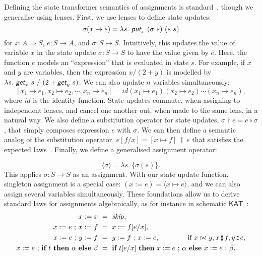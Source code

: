 \documentclass[envcountsame,envcountsect]{llncs}
\newcommand{\sskip}{\mathit{skip}}
\newcommand{\KAT}{\mathsf{KAT}}
\newcommand{\lput}{\textit{\textsf{put}}}
\newcommand{\lget}{\textit{\textsf{get}}}
\newcommand{\lto}{\Longrightarrow}
\newcommand{\lindep}{\mathop{\,\bowtie\,}}
\newcommand{\unrest}{\mathop{\sharp}}
\newcommand{\seq}{\mathop{\,;\,}}
\newcommand{\subapp}{\mathop{\,\dagger\,}}
\begin{document}
Defining the state transformer semantics of assignments is
standard~\cite{MuniveS19}, though we generalise using lenses. First,
we use lenses to define state updates:
$$\sigma(x\mapsto e) = \lambda s.\ \lput_x ~ (\sigma~s) ~ (e~s)$$
for $x : A \lto S$, $e : S \to A$, and $\sigma : S \to S$.
Intuitively, this updates the value of variable $x$ in the state
update $\sigma : S \to S$ to have the value given by $e$. Here, the
function $e$ models an ``expression'' that is evaluated in
state $s$. For example, if $x$ and $y$ are
variables, then the expression $x / (2 + y)$ is modelled by
$\lambda s. \ \lget_x~s ~/~ (2 + \lget_y~s)$. We can also update $n$
variables simultaneously:
$$[x_1 \mapsto e_1, x_2 \mapsto e_2, \cdots, x_n \mapsto e_n] = \textit{id}(x_1 \mapsto e_1)(x_2 \mapsto e_2)\cdots(x_n \mapsto e_n),$$ 
where $\textit{id}$ is the identity function. State updates
commute, when assigning to independent lenses, and cancel
one another out, when made to the same lens, in a natural
way. We also define a substitution operator for state
updates, $\sigma \dagger e = e \circ \sigma$, that simply
composes expression $e$ with $\sigma$. We can then define a
semantic analog of the substitution operator,
$e[f/x] = [x \mapsto f] \subapp e$ that satisfies the
expected laws~\cite{FosterZW16}. Finally, we define a
generalised assignment operator:

\begin{equation}
  \langle \sigma \rangle = \lambda s.\ \{ \sigma(s) \}.\tag{st-assgn}
\end{equation}
%
This applies $\sigma : S \to S$ as an assignment. With our state
update function, singleton assignment is a special case:
$(x := e) =\langle x \mapsto e \rangle$, and we can also assign
several variables simultaneously. These foundations allow us to derive
standard laws for assignments algebraically, as for instance in
schematic $\KAT$~\cite{AngusK01}:
%
\begin{align*}
  x := x &~=~ \sskip, \\
  x := e \seq x := f &~=~ x := f[e/x], \\
  x := e \seq y := f &~=~ y := f \seq x := e, \qquad\qquad
                       \textnormal{if~} x \lindep y, x \unrest f, y
                       \unrest e, \\
  x := e \seq \textbf{if}~ t ~ \textbf{then}~ \alpha ~ \textbf{else}~ \beta 
                          &~=~ \textbf{if}~ t[e/x]  ~\textbf{then}~ x := e \seq \alpha  ~\textbf{else}~ x := e \seq \beta.
\end{align*}
\end{document}
